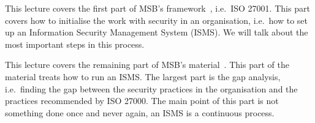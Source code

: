 This lecture covers the first part of MSB's framework~\cite{%
  MSB2011itm,MSB2011sle,MSB2011p,MSB2011v,MSB2011r%
}, i.e.~ISO 27001.
This part covers how to initialise the work with security in an organisation, 
i.e.~how to set up an Information Security Management System (ISMS).
We will talk about the most important steps in this process.

This lecture covers the remaining part of MSB's material~\cite{%
	MSB2011gap,MSB2011vs,MSB2011us,MSB2011upo,%
	MSB2011pg,MSB2011koa,MSB2011i,MSB2011o,MSB2011g,%
	MSB2011lg,MSB2011ulo,MSB2011kf,MSB2011fa%
}.
This part of the material treats how to run an ISMS\@.
The largest part is the gap analysis, i.e.~finding the gap between the security 
practices in the organisation and the practices recommended by ISO 27000.
The main point of this part is not something done once and never again, an ISMS 
is a continuous process.

